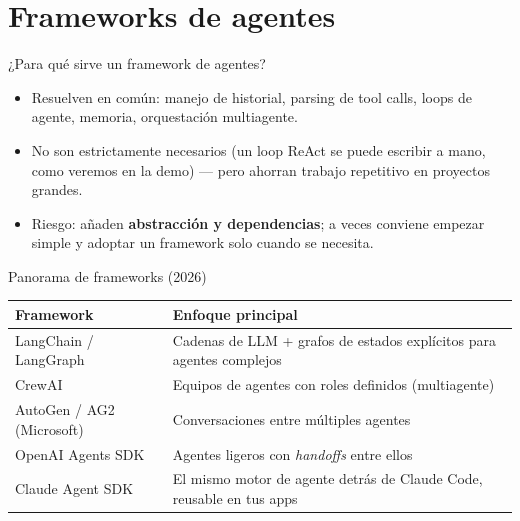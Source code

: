 \section{Frameworks de agentes}

\begin{frame}{¿Para qué sirve un framework de agentes?}
  \begin{itemize}
    \item Resuelven en común: manejo de historial, parsing de tool calls,
      loops de agente, memoria, orquestación multiagente.
    \item No son estrictamente necesarios (un loop ReAct se puede escribir
      a mano, como veremos en la demo) — pero ahorran trabajo repetitivo
      en proyectos grandes.
    \item Riesgo: añaden \textbf{abstracción y dependencias}; a veces
      conviene empezar simple y adoptar un framework solo cuando se
      necesita.
  \end{itemize}
\end{frame}

\begin{frame}{Panorama de frameworks (2026)}
  \small
  \begin{center}
  \begin{tabular}{@{}p{2.6cm}p{5.6cm}@{}}
    \toprule
    \textbf{Framework} & \textbf{Enfoque principal} \\
    \midrule
    LangChain / LangGraph & Cadenas de LLM + grafos de estados explícitos para agentes complejos \\
    CrewAI & Equipos de agentes con roles definidos (multiagente) \\
    AutoGen / AG2 (Microsoft) & Conversaciones entre múltiples agentes \\
    OpenAI Agents SDK & Agentes ligeros con \emph{handoffs} entre ellos \\
    Claude Agent SDK & El mismo motor de agente detrás de Claude Code, reusable en tus apps \\
    \bottomrule
  \end{tabular}
  \end{center}
\end{frame}


